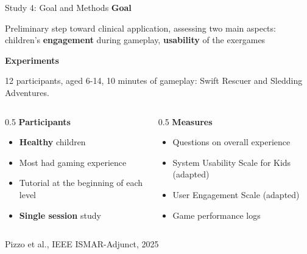 \documentclass[aspectratio=169, 12pt]{beamer}
\newcommand{\citefooter}[1]{\hfill{\tiny #1}}
\begin{document}
\begin{frame}{Study 4: Goal and Methods}
	\textbf{\textcolor{gbAqua}{Goal}}
	
	Preliminary step toward clinical application, assessing two main aspects: children's \textbf{engagement} during gameplay, \textbf{usability} of the exergames
	
	\textbf{\textcolor{gbAqua}{Experiments}}
	
	12 participants, aged 6-14, 10 minutes of gameplay: Swift Rescuer and Sledding Adventures.
	
	\vspace{0.3cm}
	
	\begin{columns}[T]
		\begin{column}{0.5\textwidth}
			\textbf{\textcolor{gbAqua}{Participants}}
			\begin{itemize}
				\item \textbf{Healthy} children
				\item Most had gaming experience
				\item Tutorial at the beginning of each level
				\item \textbf{Single session} study
			\end{itemize}
		\end{column}
		\begin{column}{0.5\textwidth}
			\textbf{\textcolor{gbAqua}{Measures}}
			\begin{itemize}
				\item Questions on overall experience
				\item System Usability Scale for Kids (adapted)
				\item User Engagement Scale (adapted)
				\item Game performance logs
			\end{itemize}
		\end{column}
	\end{columns}
	
	\citefooter{Pizzo et al., IEEE ISMAR-Adjunct, 2025}
\end{frame}
\end{document}
